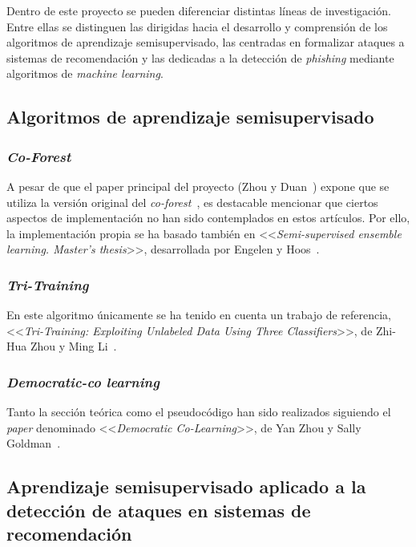 
Dentro de este proyecto se pueden diferenciar distintas líneas de investigación. Entre ellas se distinguen las dirigidas hacia el desarrollo y comprensión de los algoritmos de aprendizaje semisupervisado, las centradas en formalizar ataques a sistemas de recomendación y las dedicadas a la detección de \textit{phishing} mediante algoritmos de \textit{machine learning}.

\subsection{Algoritmos de aprendizaje semisupervisado}

\subsubsection{\textit{Co-Forest}}

A pesar de que el paper principal del proyecto (Zhou y Duan~\cite{zhou2021SemisupervisedRecommendationAttack}) expone que se utiliza la versión original del \textit{co-forest}~\cite{originalCoForest2007}, es destacable mencionar que ciertos aspectos de implementación no han sido contemplados en estos artículos. Por ello, la implementación propia se ha basado también en <<\textit{Semi-supervised ensemble learning. Master’s thesis}>>, desarrollada por Engelen y Hoos~\cite{engelen2018thesis}.

\subsubsection{\textit{Tri-Training}}

En este algoritmo únicamente se ha tenido en cuenta un trabajo de referencia, <<\textit{Tri-Training: Exploiting Unlabeled Data Using Three Classifiers}>>, de Zhi-Hua Zhou y Ming Li~\cite{tritraining2005@original}.

\subsubsection{\textit{Democratic-co learning}}

Tanto la sección teórica como el pseudocódigo han sido realizados siguiendo el \textit{paper} denominado <<\textit{Democratic Co-Learning}>>, de Yan Zhou y Sally Goldman~\cite{democraticCoLearning2004original}.


\subsection{Aprendizaje semisupervisado aplicado a la detección de ataques en sistemas de recomendación}

